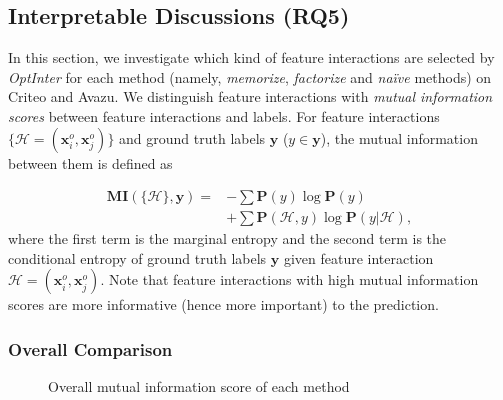 \documentclass[conference]{IEEEtran}
\begin{document}
\subsection{Interpretable Discussions (RQ5)}

In this section, we investigate which kind of feature interactions are selected by \textit{OptInter} for each method (namely, \emph{memorize}, \emph{factorize} and \emph{naïve} methods) on Criteo and Avazu. 
We distinguish feature interactions with \emph{mutual information scores} between feature interactions and labels. For feature interactions $\{\mathcal{H}=(\mathbf{x}^o_i, \mathbf{x}^o_j)\}$ and ground truth labels $\mathbf{y}$ ($y \in \mathbf{y}$), the mutual information between them is defined as

\begin{equation}
\begin{split}
    \mathbf{MI}(\mathcal{\{H\}},\mathbf{y}) = &-\sum \mathbf{P}(y) \log \mathbf{P}(y) \\
    &+ \sum \mathbf{P}(\mathcal{H} ,y) \log \mathbf{P}(y|\mathcal{H}),
\end{split}
\end{equation}
where the first term is the marginal entropy and the second term is the conditional entropy of ground truth labels $\mathbf{y}$ given feature interaction $\mathcal{H} = (\mathbf{x}^o_{i},\mathbf{x}^o_{j})$. Note that feature interactions with high mutual information scores are more informative (hence more important) to the prediction. 

\subsubsection{Overall Comparison}

\begin{figure}[!htbp]
\centering
{}

\caption{Overall mutual information score of each method}
\label{fig:dataset} 
\end{figure}
\end{document}
